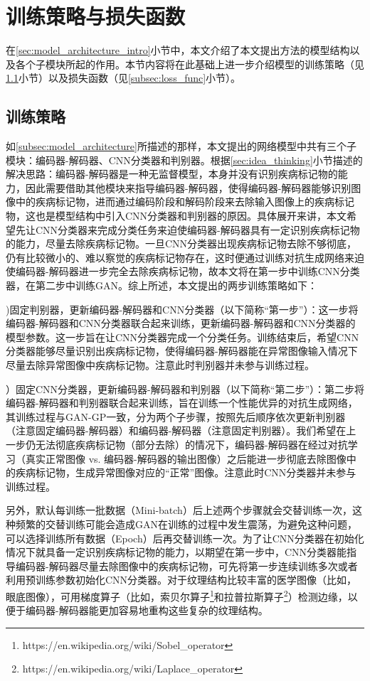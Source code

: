 \section{训练策略与损失函数}\label{sec:loss_func_training_stragies}
在\ref{sec:model_architecture_intro}小节中，本文介绍了本文提出方法的模型结构以及各个子模块所起的作用。本节内容将在此基础上进一步介绍模型的训练策略（见\ref{subsec:traing_stragies}小节）以及损失函数（见\ref{subsec:loss_func}小节）。
\subsection{训练策略}\label{subsec:traing_stragies}
如\ref{subsec:model_architecture}所描述的那样，本文提出的网络模型中共有三个子模块：编码器-解码器、CNN分类器和判别器。根据\ref{sec:idea_thinking}小节描述的解决思路：编码器-解码器是一种无监督模型，本身并没有识别疾病标记物的能力，因此需要借助其他模块来指导编码器-解码器，使得编码器-解码器能够识别图像中的疾病标记物，进而通过编码阶段和解码阶段来去除输入图像上的疾病标记物，这也是模型结构中引入CNN分类器和判别器的原因。具体展开来讲，本文希望先让CNN分类器来完成分类任务来迫使编码器-解码器具有一定识别疾病标记物的能力，尽量去除疾病标记物。一旦CNN分类器出现疾病标记物去除不够彻底，仍有比较微小的、难以察觉的疾病标记物存在，这时便通过训练对抗生成网络来迫使编码器-解码器进一步完全去除疾病标记物，故本文将在第一步中训练CNN分类器，在第二步中训练GAN。综上所述，本文提出的两步训练策略如下：

)固定判别器，更新编码器-解码器和CNN分类器（以下简称“第一步”）：这一步将编码器-解码器和CNN分类器联合起来训练，更新编码器-解码器和CNN分类器的模型参数。这一步旨在让CNN分类器完成一个分类任务。训练结束后，希望CNN分类器能够尽量识别出疾病标记物，使得编码器-解码器能在异常图像输入情况下尽量去除异常图像中疾病标记物。注意此时判别器并未参与训练过程。

）固定CNN分类器，更新编码器-解码器和判别器（以下简称“第二步”）：第二步将编码器-解码器和判别器联合起来训练，旨在训练一个性能优异的对抗生成网络，其训练过程与GAN-GP一致，分为两个子步骤，按照先后顺序依次更新判别器（注意固定编码器-解码器）和编码器-解码器（注意固定判别器）。我们希望在上一步仍无法彻底疾病标记物（部分去除）的情况下，编码器-解码器在经过对抗学习（真实正常图像 vs. 编码器-解码器的输出图像）之后能进一步彻底去除图像中的疾病标记物，生成异常图像对应的“正常”图像。注意此时CNN分类器并未参与训练过程。

另外，默认每训练一批数据（Mini-batch）后上述两个步骤就会交替训练一次，这种频繁的交替训练可能会造成GAN在训练的过程中发生震荡，为避免这种问题，可以选择训练所有数据（Epoch）后再交替训练一次。为了让CNN分类器在初始化情况下就具备一定识别疾病标记物的能力，以期望在第一步中，CNN分类器能指导编码器-解码器尽量去除图像中的疾病标记物，可先将第一步连续训练多次或者利用预训练参数初始化CNN分类器。对于纹理结构比较丰富的医学图像（比如，眼底图像），可用梯度算子（比如，索贝尔算子\footnote{https://en.wikipedia.org/wiki/Sobel\_operator}和拉普拉斯算子\footnote{https://en.wikipedia.org/wiki/Laplace\_operator}）检测边缘，以便于编码器-解码器能更加容易地重构这些复杂的纹理结构。

